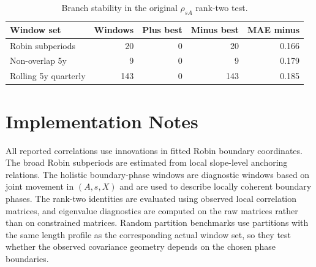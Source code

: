 \documentclass[11pt]{article}
\begin{document}
\begin{table}[!htbp]
\centering
\small
\begin{tabular}{lrrrr}
\toprule
Window set & Windows & Plus best & Minus best & MAE minus \\
\midrule
Robin subperiods & 20 & 0 & 20 & 0.166 \\
Non-overlap 5y & 9 & 0 & 9 & 0.179 \\
Rolling 5y quarterly & 143 & 0 & 143 & 0.185 \\
\bottomrule
\end{tabular}
\caption{Branch stability in the original $\rho_{sA}$ rank-two test.}
\label{tab:branch}
\end{table}

\section{Implementation Notes}

All reported correlations use innovations in fitted Robin boundary coordinates. The broad Robin subperiods are estimated from local slope-level anchoring relations. The holistic boundary-phase windows are diagnostic windows based on joint movement in $(A,s,X)$ and are used to describe locally coherent boundary phases. The rank-two identities are evaluated using observed local correlation matrices, and eigenvalue diagnostics are computed on the raw matrices rather than on constrained matrices. Random partition benchmarks use partitions with the same length profile as the corresponding actual window set, so they test whether the observed covariance geometry depends on the chosen phase boundaries.
\end{document}
